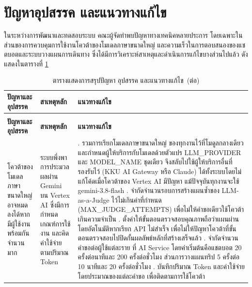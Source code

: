 \section{ปัญหาอุปสรรค และแนวทางแก้ไข}

ในระหว่างการพัฒนาและทดสอบระบบ คณะผู้จัดทำพบปัญหาทางเทคนิคหลายประการ โดยเฉพาะในส่วนของการควบคุมการใช้งานโควต้าของโมเดลภาษาขนาดใหญ่ และความเร็วในการตอบสนองของแชตบอตและระบบวางแผนการเดินทาง ซึ่งได้มีการวิเคราะห์สาเหตุและดำเนินการแก้ไขบางส่วนไปแล้ว ดังแสดงในตารางที่ \ref{tab:problems}

{\small
\begin{longtable}{|>{\raggedright\arraybackslash}p{2.9cm}|>{\raggedright\arraybackslash}p{4.9cm}|>{\raggedright\arraybackslash}p{5.5cm}|}
\caption{ตารางแสดงการสรุปปัญหา อุปสรรค และแนวทางแก้ไข}\label{tab:problems}\\
\hline
\textbf{ปัญหาและอุปสรรค} & \textbf{สาเหตุหลัก} & \textbf{แนวทางแก้ไข} \\
\hline
\endfirsthead
\caption[]{ตารางแสดงการสรุปปัญหา อุปสรรค และแนวทางแก้ไข~(\textnormal{ต่อ})}\\
\hline
\textbf{ปัญหาและอุปสรรค} & \textbf{สาเหตุหลัก} & \textbf{แนวทางแก้ไข} \\
\hline
\endhead
โควต้าของโมเดลภาษาขนาดใหญ่ อาจหมดลงได้หากมีผู้ใช้งานพร้อมกันจำนวนมาก & ระบบพึ่งพาการประมวลผลผ่าน Gemini บน Vertex AI ซึ่งมีการกำหนดเกณฑ์การใช้งาน และคิดค่าใช้จ่ายตามปริมาณ Token & 1. รวมการเรียกโมเดลภาษาขนาดใหญ่ ของทุกงานไว้ที่โมดูลกลางเดียว และกำหนดผู้ให้บริการกับโมเดลด้วยตัวแปร LLM\_PROVIDER และ MODEL\_NAME ชุดเดียว จึงสลับไปใช้ผู้ให้บริการอื่นที่รองรับไว้ (KKU AI Gateway หรือ Claude) ได้ทั้งระบบโดยไม่แก้โค้ดเมื่อโควต้าของ Vertex AI มีปัญหา แม้ปัจจุบันทุกงานจะใช้ gemini-3.8-flash \newline 2. จำกัดจำนวนรอบการสร้างแผนซ้ำของ LLM-as-a-Judge ไว้ไม่เกินค่าที่กำหนด (MAX\_JUDGE\_ATTEMPTS) เพื่อไม่ให้คำขอเดียวใช้โควต้าเกินความจำเป็น \newline 3. ตั้งค่าให้ขั้นตอนตรวจสอบคุณภาพถือว่าแผนผ่านโดยอัตโนมัติหากเรียก API ไม่สำเร็จ เพื่อไม่ให้ปัญหาโควต้าที่ขั้นตอนตรวจสอบไปปิดกั้นผลลัพธ์หลักที่สร้างเสร็จแล้ว \newline 4. จำกัดจำนวนคำขอต่อผู้ใช้แต่ละราย ที่ AI Service โดยค่าเริ่มต้นคือแชตบอต 20 ครั้งต่อนาทีและ 200 ครั้งต่อชั่วโมง ส่วนการวางแผนทริป 5 ครั้งต่อ 10 นาทีและ 20 ครั้งต่อชั่วโมง \newline 5. บันทึกปริมาณ Token และค่าใช้จ่ายโดยประมาณของแต่ละคำขอ เพื่อติดตามการใช้โควต้า \\

\end{longtable}}
